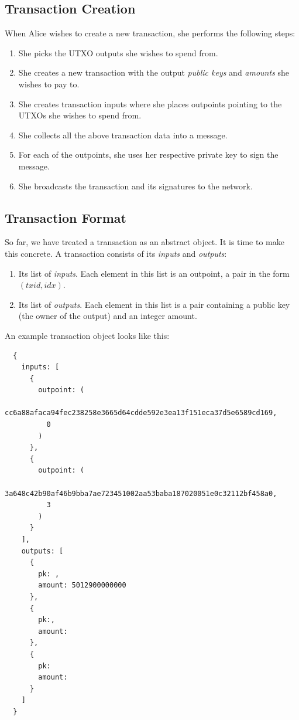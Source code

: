 \subsection*{Transaction Creation}

When Alice wishes to create a new transaction, she performs the following steps:

\begin{enumerate}
  \item She picks the UTXO outputs she wishes to spend from.
  \item She creates a new transaction with the output \emph{public keys} and \emph{amounts} she wishes to pay to.
  \item She creates transaction inputs where she places outpoints pointing to the UTXOs she wishes to spend from.
  \item She collects all the above transaction data into a message.
  \item For each of the outpoints, she uses her respective private key to sign the message.
  \item She broadcasts the transaction and its signatures to the network.
\end{enumerate}

\subsection*{Transaction Format}

So far, we have treated a transaction as an abstract object. It is time to make this concrete. A transaction
consists of its \emph{inputs} and \emph{outputs}:

\begin{enumerate}
  \item Its list of \emph{inputs}. Each element in this list is an outpoint, a pair in the form $(txid, idx)$.
  \item Its list of \emph{outputs}. Each element in this list is a pair containing a public key
        (the owner of the output) and an integer amount.
\end{enumerate}

An example transaction object looks like this:

\begin{verbatim}
  {
    inputs: [
      {
        outpoint: (
          cc6a88afaca94fec238258e3665d64cdde592e3ea13f151eca37d5e6589cd169,
          0
        )
      },
      {
        outpoint: (
          3a648c42b90af46b9bba7ae723451002aa53baba187020051e0c32112bf458a0,
          3
        )
      }
    ],
    outputs: [
      {
        pk: ,
        amount: 5012900000000
      },
      {
        pk:,
        amount:
      },
      {
        pk:
        amount:
      }
    ]
  }
\end{verbatim}

